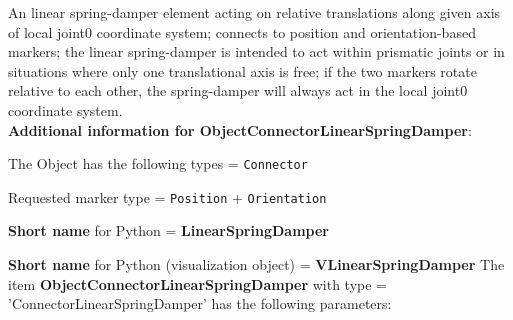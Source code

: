 %
\newpage

\label{sec:item:ObjectConnectorLinearSpringDamper}
An linear spring-damper element acting on relative translations along given axis of local joint0 coordinate system; connects to position and orientation-based markers; the linear spring-damper is intended to act within prismatic joints or in situations where only one translational axis is free; if the two markers rotate relative to each other, the spring-damper will always act in the local joint0 coordinate system.\vspace{12pt}
 \\{\bf Additional information for ObjectConnectorLinearSpringDamper}:
\bi
  \item The Object has the following types = \texttt{Connector}
  \item Requested marker type = \texttt{Position} + \texttt{Orientation}
  \item {\bf Short name} for Python = {\bf LinearSpringDamper}  \item {\bf Short name} for Python (visualization object) = {\bf VLinearSpringDamper}\ei
\vspace{12pt} \noindent The item {\bf ObjectConnectorLinearSpringDamper} with type = 'ConnectorLinearSpringDamper' has the following parameters:\vspace{-1cm}\\ 
